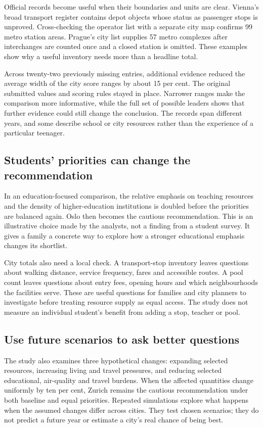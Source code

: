 Official records become useful when their boundaries and units are clear. Vienna's broad transport register contains depot objects whose status as passenger stops is unproved. Cross-checking the operator list with a separate city map confirms 99 metro station areas. Prague's city list supplies 57 metro complexes after interchanges are counted once and a closed station is omitted. These examples show why a useful inventory needs more than a headline total.

Across twenty-two previously missing entries, additional evidence reduced the average width of the city score ranges by about 15 per cent. The original submitted values and scoring rules stayed in place. Narrower ranges make the comparison more informative, while the full set of possible leaders shows that further evidence could still change the conclusion. The records span different years, and some describe school or city resources rather than the experience of a particular teenager.

\newpage
\subsection*{Students' priorities can change the recommendation}

In an education-focused comparison, the relative emphasis on teaching resources and the density of higher-education institutions is doubled before the priorities are balanced again. Oslo then becomes the cautious recommendation. This is an illustrative choice made by the analysts, not a finding from a student survey. It gives a family a concrete way to explore how a stronger educational emphasis changes its shortlist.

City totals also need a local check. A transport-stop inventory leaves questions about walking distance, service frequency, fares and accessible routes. A pool count leaves questions about entry fees, opening hours and which neighbourhoods the facilities serve. These are useful questions for families and city planners to investigate before treating resource supply as equal access. The study does not measure an individual student's benefit from adding a stop, teacher or pool.

\subsection*{Use future scenarios to ask better questions}

The study also examines three hypothetical changes: expanding selected resources, increasing living and travel pressures, and reducing selected educational, air-quality and travel burdens. When the affected quantities change uniformly by ten per cent, Zurich remains the cautious recommendation under both baseline and equal priorities. Repeated simulations explore what happens when the assumed changes differ across cities. They test chosen scenarios; they do not predict a future year or estimate a city's real chance of being best.

